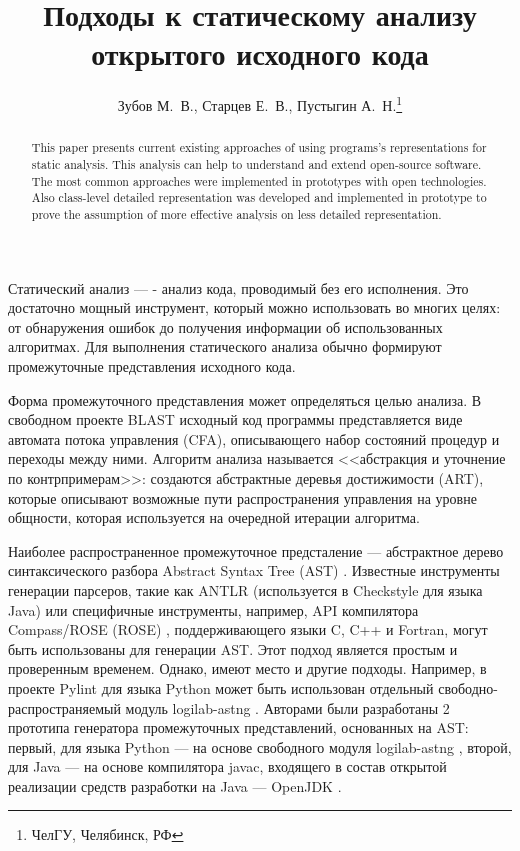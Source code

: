 \documentclass[10pt, a5paper]{article}
\begin{document}
\title{Подходы к статическому анализу открытого исходного кода}%

\author{Зубов М.~В., Старцев Е.~В., Пустыгин А.~Н.\footnote{ЧелГУ, Челябинск, РФ}}
\maketitle

\begin{abstract}
This paper presents current existing approaches of using programs's representations for static analysis. This analysis can help to understand and extend open-source software. The most common approaches were implemented in prototypes with open technologies. Also class-level detailed representation was developed and implemented in prototype to prove the assumption of more effective analysis on less detailed representation.
\end{abstract}

Статический анализ  --- - анализ кода, проводимый без его исполнения. Это достаточно мощный инструмент, который можно использовать во многих целях: от обнаружения ошибок до получения информации об использованных алгоритмах. Для выполнения статического анализа обычно формируют промежуточные представления исходного кода.

Форма промежуточного представления может определяться целью анализа. В свободном проекте BLAST \cite{Zubov1} исходный код программы представляется виде автомата потока управления (CFA), описывающего набор состояний процедур и переходы между ними. Алгоритм анализа называется <<абстракция и уточнение по  контрпримерам>>: создаются абстрактные деревья достижимости (ART), которые описывают возможные пути распространения управления на уровне общности, которая используется на очередной итерации алгоритма.

Наиболее распространенное промежуточное предсталение — абстрактное дерево синтаксического разбора Abstract Syntax Tree (AST) \cite{Zubov2}. Известные инструменты генерации парсеров, такие как ANTLR \cite{Zubov3} (используется в Checkstyle \cite{Zubov4} для языка Java) или специфичные инструменты, например, API компилятора Compass/ROSE (ROSE) \cite{Zubov5}, поддерживающего языки C, C++ и Fortran, могут быть использованы для генерации AST. Этот подход является простым и проверенным временем. Однако, имеют место и другие подходы. Например, в проекте Pylint \cite{Zubov6} для языка Python может быть использован отдельный свободно-распространяемый модуль logilab-astng \cite{Zubov7}. Авторами были разработаны 2 прототипа генератора промежуточных представлений, основанных на AST: первый, для языка Python --- на основе свободного модуля logilab-astng \cite{Zubov7}, второй, для Java --- на основе компилятора javac, входящего в состав открытой реализации средств разработки на Java --- OpenJDK \cite{Zubov8}.
\end{document}

